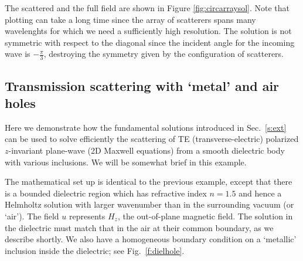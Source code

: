 The scattered and the full field are shown in Figure
\ref{fig:circarraysol}. Note that plotting can take a long time since
the array of scatterers spans many wavelenghts for which we need a
sufficiently high resolution. The solution is not symmetric with
respect to the diagonal since the incident angle for the incoming wave is
$-\frac{\pi}{3}$, destroying the symmetry given by the configuration
of scatterers.














\bfi %
\efi
\bfi %
\bc{}\ec
{}
\efi

\subsection{Transmission scattering with `metal' and air holes}
\label{s:dielhole}

Here we demonstrate how the fundamental solutions introduced in
Sec.~\ref{s:ext} can be used to solve efficiently
the scattering of TE (transverse-electric) polarized $z$-invariant
plane-wave (2D Maxwell equations) from a smooth dielectric body with various
inclusions. We will be somewhat brief in this example.

The mathematical set up is identical to the previous example, except that
there is a bounded dielectric region which has refractive index $n = 1.5$ and
hence a Helmholtz solution with
larger wavenumber than in the surrounding vacuum (or `air').
The field $u$ represents $H_z$, the out-of-plane magnetic field.
The solution in the dielectric must match that in the air at their common
boundary, as we describe shortly. We also have a homogeneous boundary condition
on a `metallic' inclusion inside the dielectric; see Fig.~\ref{f:dielhole}.

